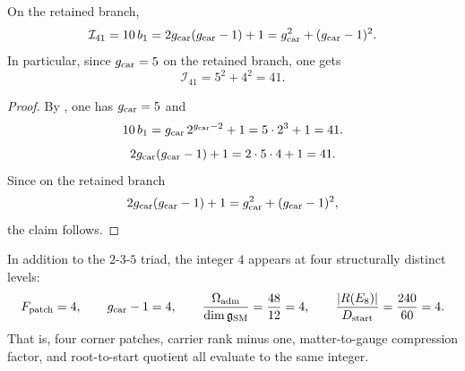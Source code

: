 \begin{corollary}
\label{cor:pythagorean-integrity-index}
On the retained branch,
\[
\mathcal I_{41}
=
10\,b_1
=
2g_{\mathrm{car}}(g_{\mathrm{car}}-1)+1
=
g_{\mathrm{car}}^2+(g_{\mathrm{car}}-1)^2.
\]
In particular, since $g_{\mathrm{car}}=5$ on the retained branch, one gets
\[
\mathcal I_{41}=5^2+4^2=41.
\]
\end{corollary}

\begin{proof}
By , one has $g_{\mathrm{car}}=5$ and
\[
10\,b_1=g_{\mathrm{car}}\,2^{g_{\mathrm{car}}-2}+1=5\cdot 2^3+1=41.
\]
\[
2g_{\mathrm{car}}(g_{\mathrm{car}}-1)+1=2\cdot 5\cdot 4+1=41.
\]
Since on the retained branch
\[
2g_{\mathrm{car}}(g_{\mathrm{car}}-1)+1=g_{\mathrm{car}}^2+(g_{\mathrm{car}}-1)^2,
\]
the claim follows.
\end{proof}

\begin{remark}
In addition to the $2$-$3$-$5$ triad, the integer $4$ appears at four structurally distinct levels:
\[
F_{\mathrm{patch}}=4,
\qquad
g_{\mathrm{car}}-1=4,
\qquad
\frac{\Omega_{\mathrm{adm}}}{\dim\mathfrak g_{\mathrm{SM}}}=\frac{48}{12}=4,
\qquad
\frac{|R(E_8)|}{D_{\mathrm{start}}}=\frac{240}{60}=4.
\]
That is, four corner patches, carrier rank minus one, matter-to-gauge compression factor, and root-to-start quotient all evaluate to the same integer.
\end{remark}

